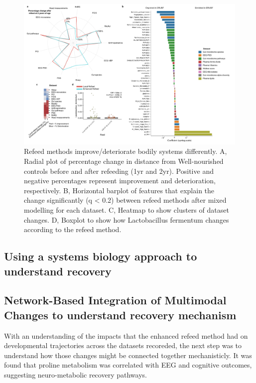 \documentclass{article}
\begin{document}
\begin{figure}[H]
	\centering
	\includegraphics[scale=0.6]{figures/newrecoveryfeed3.pdf}
	\caption[Refeed methods improve/deteriorate bodily systems differently]{
		Refeed methods improve/deteriorate bodily systems differently.
		A, Radial plot of percentage change in distance from Well-nourished controls before and after refeeding (1yr and 2yr). Positive and negative percentages represent improvement and deterioration, respectively.
		B, Horizontal barplot of features that explain the change significantly (q < 0.2) between refeed methods after mixed modelling for each dataset.
		C, Heatmap to show clusters of dataset changes.
		D, Boxplot to show how Lactobacillus fermentum changes according to the refeed method.
	}
\label{Figure2}
\end{figure}

\subsection{Using a systems biology approach to understand recovery}

\subsection{Network-Based Integration of Multimodal Changes to understand recovery mechanism}
With an understanding of the impacts that the enhanced refeed method had on developmental trajectories across the datasets recoreded, the next step was to understand how those changes might be connected together mechanisticly.
It was found that proline metabolism was correlated with EEG and cognitive outcomes, suggesting neuro-metabolic recovery pathways.
\end{document}

